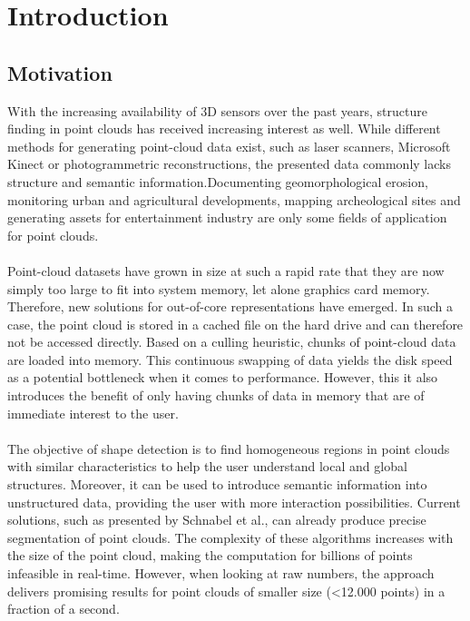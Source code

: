 \chapter{Introduction}
\newpage

\section{Motivation}

With the increasing availability of 3D sensors over the past years, structure finding in point clouds has received increasing interest as well. While different methods for generating point-cloud data exist, such as laser scanners, Microsoft Kinect or photogrammetric reconstructions, the presented data commonly lacks structure and semantic information.Documenting geomorphological erosion, monitoring urban and agricultural developments, mapping archeological sites and generating assets for entertainment industry are only some fields of application for point clouds. 
\\
\\
Point-cloud datasets have grown in size at such a rapid rate that they are now simply too large to fit into system memory, let alone graphics card memory. Therefore, new solutions for out-of-core representations have emerged. In such a case, the point cloud is stored in a cached file on the hard drive and can therefore not be accessed directly. Based on a culling heuristic, chunks of point-cloud data are loaded into memory. This continuous swapping of data yields the disk speed as a potential bottleneck when it comes to performance. However, this it also introduces the benefit of only having chunks of data in memory that are of immediate interest to the user. 
\\
\\
The objective of shape detection is to find homogeneous regions in point clouds with similar characteristics to help the user understand local and global structures. Moreover, it can be used to introduce semantic information into unstructured data, providing the user with more interaction possibilities. Current solutions, such as presented by Schnabel et al.\cite{schnabel-2007-efficient}\cite{schnabel-2007-ransac}, can already produce precise segmentation of point clouds. The complexity of these algorithms increases with the size of the point cloud, making the computation for billions of points infeasible in real-time. However, when looking at raw numbers, the approach delivers promising results for point clouds of smaller size (<12.000 points) in a fraction of a second.

